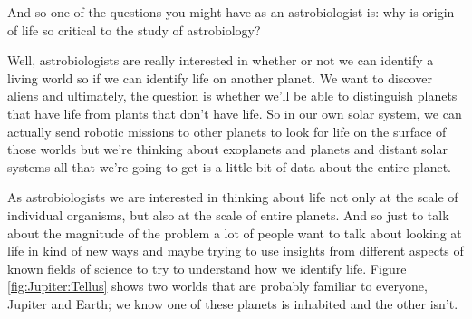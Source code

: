\documentclass[]{article}
\begin{document}
And so one of the questions you might have as an astrobiologist is: why is origin of life so critical to the study of astrobiology?

Well, astrobiologists are really interested
in whether or not we can identify a
living world so if we can identify
life on another planet.
We want to discover aliens and
ultimately, the question is whether we'll
be able to distinguish planets that have
life from plants that don't have life. So
in our own solar system, we can actually send robotic missions to other planets to look for life on the surface of those worlds but we're thinking about exoplanets and planets and distant solar systems all that we're going to get is a little bit of data about the entire planet.

As astrobiologists we are interested in thinking about life not only at the scale of individual organisms, but also at the scale of entire planets. 
And so just to talk about the magnitude of the problem a lot of people want to talk about looking at life in kind of new ways and maybe trying to use insights from different aspects of known fields of science to try to understand how we identify life.
Figure \ref{fig:Jupiter:Tellus} shows two worlds that are probably familiar to everyone, Jupiter and Earth; we know one of these planets is inhabited and the other isn't.
\end{document}
